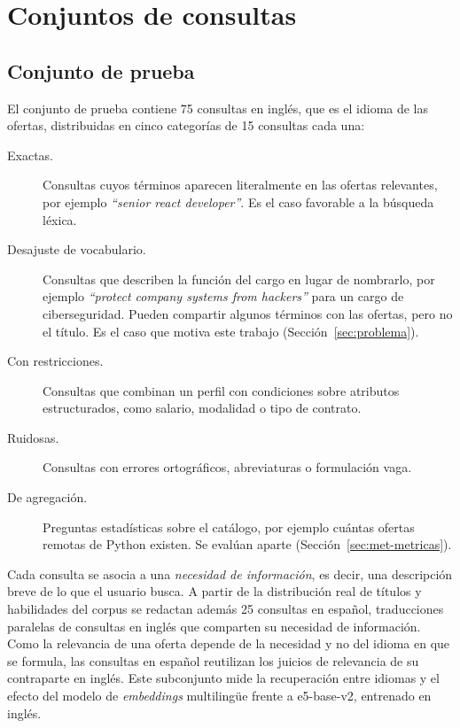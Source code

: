 \section{Conjuntos de consultas}
\label{sec:met-consultas}

\subsection{Conjunto de prueba}

El conjunto de prueba contiene 75 consultas en inglés, que es el idioma de las ofertas, distribuidas en cinco categorías de 15 consultas cada una:

\begin{description}
    \item[Exactas.] Consultas cuyos términos aparecen literalmente en las ofertas relevantes, por ejemplo \textit{\enquote{senior react developer}}. Es el caso favorable a la búsqueda léxica.
    \item[Desajuste de vocabulario.] Consultas que describen la función del cargo en lugar de nombrarlo, por ejemplo \textit{\enquote{protect company systems from hackers}} para un cargo de ciberseguridad. Pueden compartir algunos términos con las ofertas, pero no el título. Es el caso que motiva este trabajo (Sección~\ref{sec:problema}).
    \item[Con restricciones.] Consultas que combinan un perfil con condiciones sobre atributos estructurados, como salario, modalidad o tipo de contrato.
    \item[Ruidosas.] Consultas con errores ortográficos, abreviaturas o formulación vaga.
    \item[De agregación.] Preguntas estadísticas sobre el catálogo, por ejemplo cuántas ofertas remotas de Python existen. Se evalúan aparte (Sección~\ref{sec:met-metricas}).
\end{description}

Cada consulta se asocia a una \emph{necesidad de información}, es decir, una descripción breve de lo que el usuario busca. A partir de la distribución real de títulos y habilidades del corpus se redactan además 25 consultas en español, traducciones paralelas de consultas en inglés que comparten su necesidad de información. Como la relevancia de una oferta depende de la necesidad y no del idioma en que se formula, las consultas en español reutilizan los juicios de relevancia de su contraparte en inglés. Este subconjunto mide la recuperación entre idiomas y el efecto del modelo de \textit{embeddings} multilingüe frente a e5-base-v2, entrenado en inglés.

